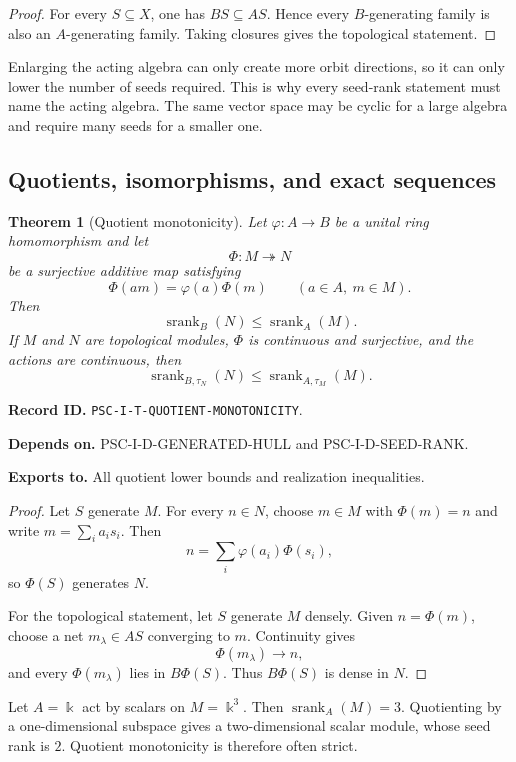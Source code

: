 \documentclass[11pt]{article}
\newtheorem{theorem}{Theorem}[section]
\theoremstyle{definition}
\theoremstyle{remark}
\newcommand{\bbk}{\Bbbk}
\newcommand{\srank}{\operatorname{srank}}
\newcommand{\RecordID}[1]{\par\smallskip\noindent\begingroup\footnotesize\color{PSCGray}\raggedright\textbf{Record ID.} \nolinkurl{#1}.\par\endgroup}
\newcommand{\Depends}[1]{\par\noindent\begingroup\footnotesize\color{PSCGray}\raggedright\textbf{Depends on.} #1\par\endgroup}
\newcommand{\Exports}[1]{\par\noindent\begingroup\footnotesize\color{PSCGray}\raggedright\textbf{Exports to.} #1\par\endgroup}
\begin{document}
\begin{proof}
For every $S\subseteq X$, one has $BS\subseteq AS$.  Hence every $B$-generating family is also an $A$-generating family.  Taking closures gives the topological statement.
\end{proof}

\begin{interpretation}
Enlarging the acting algebra can only create more orbit directions, so it can only lower the number of seeds required.  This is why every seed-rank statement must name the acting algebra.  The same vector space may be cyclic for a large algebra and require many seeds for a smaller one.
\end{interpretation}


\subsection{Quotients, isomorphisms, and exact sequences}
\begin{theorem}[Quotient monotonicity]
\label{thm:quotient-monotonicity}
Let $\varphi:A\to B$ be a unital ring homomorphism and let
\[
\Phi:M\twoheadrightarrow N
\]
be a surjective additive map satisfying
\[
\Phi(am)=\varphi(a)\Phi(m)
\qquad(a\in A,\ m\in M).
\]
Then
\[
\boxed{\srank_B(N)\leq\srank_A(M).}
\]
If $M$ and $N$ are topological modules, $\Phi$ is continuous and surjective, and the actions are continuous, then
\[
\srank_{B,\tau_N}(N)\leq\srank_{A,\tau_M}(M).
\]
\end{theorem}
\RecordID{PSC-I-T-QUOTIENT-MONOTONICITY}
\Depends{PSC-I-D-GENERATED-HULL and PSC-I-D-SEED-RANK.}
\Exports{All quotient lower bounds and realization inequalities.}

\begin{proof}
Let $S$ generate $M$.  For every $n\in N$, choose $m\in M$ with $\Phi(m)=n$ and write $m=\sum_ia_is_i$.  Then
\[
n=\sum_i\varphi(a_i)\Phi(s_i),
\]
so $\Phi(S)$ generates $N$.

For the topological statement, let $S$ generate $M$ densely.  Given $n=\Phi(m)$, choose a net $m_\lambda\in AS$ converging to $m$.  Continuity gives
\[
\Phi(m_\lambda)\longrightarrow n,
\]
and every $\Phi(m_\lambda)$ lies in $B\Phi(S)$.  Thus $B\Phi(S)$ is dense in $N$.
\end{proof}

\begin{microexample}[title={A quotient can strictly lower seed rank}]
Let \(A=\bbk\) act by scalars on \(M=\bbk^3\).  Then \(\srank_A(M)=3\).  Quotienting by a one-dimensional subspace gives a two-dimensional scalar module, whose seed rank is \(2\).  Quotient monotonicity is therefore often strict.
\end{microexample}
\end{document}
